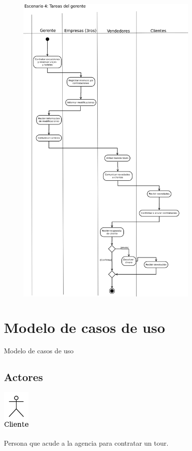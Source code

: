 \documentclass[12pt,a4paper,titlepage,oneside]{article}
\begin{document}
\begin{figure}[htb]
\centerline{\includegraphics[width=0.8\textwidth]{escenario4}}
\label{fig:celda}
\end{figure}


\section{Modelo de casos de uso}

Modelo de casos de uso 

\subsection{Actores}


\vspace*{1.5cm}

\begin{minipage}[b]{0.2\linewidth}\centering
	\includegraphics[height=2cm]{actor_cliente}
\end{minipage}
\begin{minipage}[b]{0.8\linewidth}\centering
	\begin{flushleft}
	Persona que acude a la agencia para contratar un tour. \\
	\end{flushleft}
\end{minipage}
\end{document}
